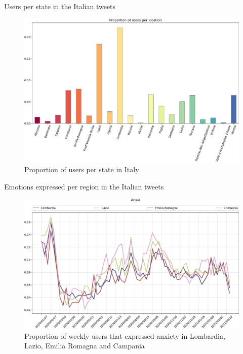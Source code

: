 \documentclass[9pt,aspectratio=1610]{beamer}  %
\begin{document}
\begin{frame}{Users per state in the Italian tweets}
    
    \begin{figure}[H]
	\centering
    	\includegraphics[scale=.30]{assets/img/it_users_per_state.svg.pdf}
    	\caption{Proportion of users per state in Italy}
    	\label{fig:it-users-state}
\end{figure}
    
\end{frame}

\begin{frame}{Emotions expressed per region in the Italian tweets}

    \begin{figure}[H]
	    \centering
    	\includegraphics[scale=.30]{assets/img/it_ansia_4_states.svg.pdf}
    	\caption{Proportion of weekly users that expressed anxiety in Lombardia, Lazio, Emilia Romagna and Campania}
    	\label{fig:it-anxiety-4-states}
    \end{figure}
    
\end{frame}
\end{document}
